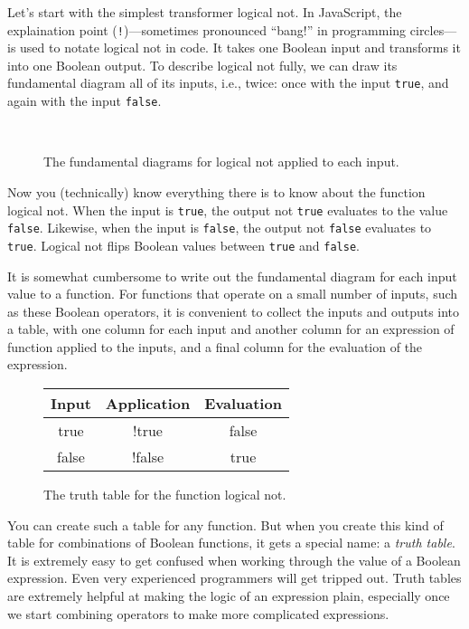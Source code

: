Let's start with the simplest transformer logical \textsf{not}. In JavaScript, the explaination point (\texttt{!})---sometimes pronounced ``bang!'' in programming circles---is used to notate logical \textsf{not} in code. It takes one \textsf{Boolean} input and transforms it into one \textsf{Boolean} output. To describe logical \textsf{not} fully, we can draw its fundamental diagram all of its inputs, i.e., twice: once with the input \texttt{true}, and again with the input \texttt{false}.

\begin{figure}
  \\
  
  \caption{\label{conds:not-fundamental-diagram.tex}The fundamental diagrams for logical \textsf{not} applied to each input.}
\end{figure}

Now you (technically) know everything there is to know about the function logical \textsf{not}. When the input is \texttt{true}, the output \textsf{not} \texttt{true} evaluates to the value \texttt{false}. Likewise, when the input is \texttt{false}, the output \textsf{not} \texttt{false} evaluates to \texttt{true}. Logical \textsf{not} flips Boolean values between \texttt{true} and \texttt{false}.

It is somewhat cumbersome to write out the fundamental diagram for each input value to a function. For functions that operate on a small number of inputs, such as these \textsf{Boolean} operators, it is convenient to collect the inputs and outputs into a table, with one column for each input and another column for an expression of function applied to the inputs, and a final column for the evaluation of the expression.

\begin{figure}[h]
  \ttfamily
  \small
  \color{cyan}
  \begin{tabular}{c  c  c}
    \textsf{Input} & \textsf{Application} & \textsf{Evaluation}\\
    \hline
    true & !true & false\\
    false & !false & true
  \end{tabular}
  \caption{\label{fig:conditionals-logical-not} The truth table for the function logical \textsf{not}.}
\end{figure}

You can create such a table for any function. But when you create this kind of table for combinations of \textsf{Boolean} functions, it gets a special name: a \emph{truth table}. It is extremely easy to get confused when working through the value of a \textsf{Boolean} expression. Even very experienced programmers will get tripped out. Truth tables are extremely helpful at making the logic of an expression plain, especially once we start combining operators to make more complicated expressions.

